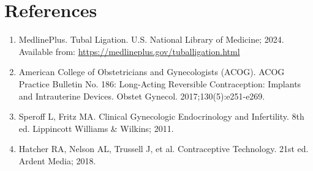 \section*{References}
\begin{enumerate}
  \item MedlinePlus. Tubal Ligation. U.S. National Library of Medicine; 2024. Available from: \url{https://medlineplus.gov/tuballigation.html}

  \item American College of Obstetricians and Gynecologists (ACOG). ACOG Practice Bulletin No. 186: Long-Acting Reversible Contraception: Implants and Intrauterine Devices. Obstet Gynecol. 2017;130(5):e251-e269. 

  \item Speroff L, Fritz MA. Clinical Gynecologic Endocrinology and Infertility. 8th ed. Lippincott Williams \& Wilkins; 2011.

  \item Hatcher RA, Nelson AL, Trussell J, et al. Contraceptive Technology. 21st ed. Ardent Media; 2018.
\end{enumerate}

\clearpage
